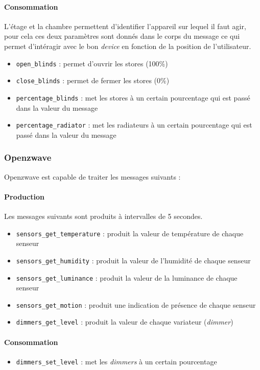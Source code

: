 \paragraph{Consommation}
L'étage et la chambre permettent d'identifier l'appareil sur lequel il faut agir, pour cela ces deux paramètres sont donnés dans le corps du message ce qui permet d'intéragir avec le bon \textit{device} en fonction de la position de l'utilisateur.
\begin{itemize}
    \item \texttt{open_blinds} : permet d'ouvrir les stores (100\%)
    \item \texttt{close_blinds} : permet de fermer les stores (0\%)
    \item \texttt{percentage_blinds} : met les stores à un certain pourcentage qui est passé dans la valeur du message
    \item \texttt{percentage_radiator} : met les radiateurs à un certain pourcentage qui est passé dans la valeur du message
\end{itemize}

\subsubsection{Openzwave}
Openzwave est capable de traiter les messages suivants : 
\paragraph{Production}
Les messages suivants sont produits à intervalles de 5 secondes.
\begin{itemize}
    \item \texttt{sensors_get_temperature} : produit la valeur de température de chaque senseur
    \item \texttt{sensors_get_humidity} : produit la valeur de l'humidité de chaque senseur
    \item \texttt{sensors_get_luminance} : produit la valeur de la luminance de chaque senseur
    \item \texttt{sensors_get_motion} : produit une indication de présence de chaque senseur
    \item \texttt{dimmers_get_level} : produit la valeur de chaque variateur (\textit{dimmer})
\end{itemize}

\paragraph{Consommation}
\begin{itemize}
    \item \texttt{dimmers_set_level} : met les \textit{dimmers} à un certain pourcentage
\end{itemize}

